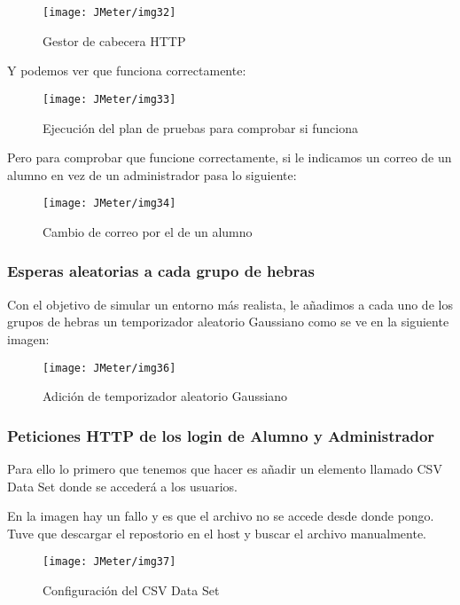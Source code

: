 \begin{figure}[H]
    \centering
    \texttt{[image: JMeter/img32]}
    \caption{Gestor de cabecera HTTP}
\end{figure}

Y podemos ver que funciona correctamente:

\begin{figure}[H]
    \centering
    \texttt{[image: JMeter/img33]}
    \caption{Ejecución del plan de pruebas para comprobar si funciona}
\end{figure}

Pero para comprobar que funcione correctamente, si le indicamos un correo de un alumno en vez de un administrador pasa lo siguiente:

\begin{figure}[H]
    \centering
    \texttt{[image: JMeter/img34]}
    \caption{Cambio de correo por el de un alumno}
\end{figure}

\subsubsection{Esperas aleatorias a cada grupo de hebras}

Con el objetivo de simular un entorno más realista, le añadimos a cada uno de los grupos de hebras un temporizador aleatorio Gaussiano como se ve en la siguiente imagen:

\begin{figure}[H]
    \centering
    \texttt{[image: JMeter/img36]}
    \caption{Adición de temporizador aleatorio Gaussiano}
\end{figure}

\newpage
\subsubsection{Peticiones HTTP de los login de Alumno y Administrador}

Para ello lo primero que tenemos que hacer es añadir un elemento llamado CSV Data Set donde se accederá a los usuarios.

En la imagen hay un fallo y es que el archivo no se accede desde donde pongo. Tuve que descargar el repostorio en el host y buscar el archivo manualmente.
\begin{figure}[H]
    \centering
    \texttt{[image: JMeter/img37]}
    \caption{Configuración del CSV Data Set}
\end{figure}

